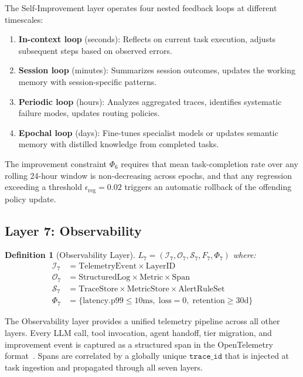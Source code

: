 \documentclass[11pt]{article}
\newtheorem{definition}{Definition}
\begin{document}
The Self-Improvement layer operates four nested feedback loops at different
timescales:

\begin{enumerate}[leftmargin=1.5em]
    \item \textbf{In-context loop} (seconds): Reflects on current task
          execution, adjusts subsequent steps based on observed errors.
    \item \textbf{Session loop} (minutes): Summarizes session outcomes,
          updates the working memory with session-specific patterns.
    \item \textbf{Periodic loop} (hours): Analyzes aggregated traces,
          identifies systematic failure modes, updates routing policies.
    \item \textbf{Epochal loop} (days): Fine-tunes specialist models or
          updates semantic memory with distilled knowledge from completed tasks.
\end{enumerate}

The improvement constraint $\Phi_6$ requires that mean task-completion rate
over any rolling 24-hour window is non-decreasing across epochs, and that any
regression exceeding a threshold $\epsilon_{\text{reg}} = 0.02$ triggers an
automatic rollback of the offending policy update.

\subsection{Layer 7: Observability}

\begin{definition}[Observability Layer]
    $L_7 = \left(\mathcal{I}_7, \mathcal{O}_7, \mathcal{S}_7, F_7, \Phi_7\right)$ where:
    \begin{align*}
        \mathcal{I}_7 &= \text{TelemetryEvent} \times \text{LayerID} \\
        \mathcal{O}_7 &= \text{StructuredLog} \times \text{Metric} \times \text{Span} \\
        \mathcal{S}_7 &= \text{TraceStore} \times \text{MetricStore} \times
                         \text{AlertRuleSet} \\
        \Phi_7 &= \{\text{latency.p99} \leq 10\text{ms},\;
                    \text{loss} = 0,\; \text{retention} \geq 30\text{d}\}
    \end{align*}
\end{definition}

The Observability layer provides a unified telemetry pipeline across all
other layers. Every LLM call, tool invocation, agent handoff, tier migration,
and improvement event is captured as a structured span in the OpenTelemetry
format~\cite{opentelemetry2023}. Spans are correlated by a globally unique
$\texttt{trace\_id}$ that is injected at task ingestion and propagated through
all seven layers.
\end{document}
